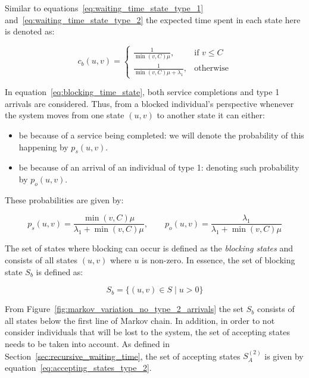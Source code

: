 Similar to equations~\eqref{eq:waiting_time_state_type_1}
and~\eqref{eq:waiting_time_state_type_2} the expected time spent in each state
here is denoted as:

\begin{equation}\label{eq:blocking_time_state}
    c_b(u,v) =
    \begin{cases}
        \frac{1}{\min(v,C) \mu}, & \text{if } v \leq C\\
        \frac{1}{\min(v,C) \mu + \lambda_1}, & \text{otherwise}
    \end{cases}
\end{equation}

In equation~\eqref{eq:blocking_time_state}, both service completions and
type 1 arrivals are considered.
Thus, from a blocked individual's perspective whenever the system moves from one
state \((u,v)\) to another state it can either:

\begin{itemize}
    \item be because of a service being completed: we will denote the
    probability of this happening by \(p_s(u,v)\).
    \item be because of an arrival of an individual of type 1: denoting such
    probability by \(p_o(u,v)\).
\end{itemize}

These probabilities are given by:

\begin{equation}\label{eq:blocking_time_probs}
    p_s(u,v) = \frac{\min(v,C)\mu}{\lambda_1 + \min(v,C)\mu}, \qquad
    p_o(u,v) = \frac{\lambda_1}{\lambda_1 + \min(v,C)\mu}
\end{equation}




The set of states where blocking can occur is defined as the \textit{blocking
states} and consists of all states \((u,v)\) where \(u\) is non-zero.
In essence, the set of blocking state \(S_b\) is defined as:

\begin{equation}\label{eq:blocking_states}
    S_b = \{(u,v) \in S \; | \; u > 0\}
\end{equation}

From Figure~\ref{fig:markov_variation_no_type_2_arrivals} the set \(S_b\)
consists of all states below the first line of Markov chain.
In addition, in order to not consider individuals that will be lost to the
system, the set of accepting states needs to be taken into account.
As defined in Section~\ref{sec:recursive_waiting_time}, the set of accepting
states \(S_A^{(2)}\) is given by equation~\eqref{eq:accepting_states_type_2}.

